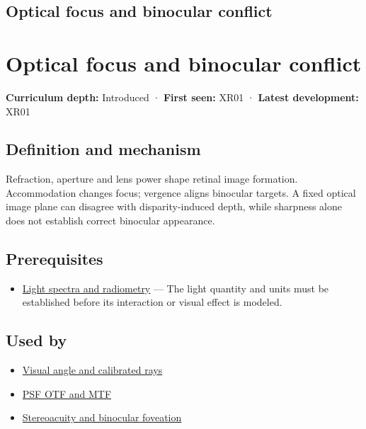 \hypertarget{appendix-f90cee1be7a4}{}
\section*{Optical focus and binocular conflict}
\chapter{Optical focus and binocular conflict}\label{appendix-f90cee1be7a4-optical-focus-and-binocular-conflict}

\textbf{Curriculum depth:} Introduced · \textbf{First seen:} XR01 · \textbf{Latest development:} XR01

\section{Definition and mechanism}\label{appendix-f90cee1be7a4-definition-and-mechanism}

Refraction, aperture and lens power shape retinal image formation. Accommodation changes focus; vergence aligns binocular targets. A fixed optical image plane can disagree with disparity-induced depth, while sharpness alone does not establish correct binocular appearance.

\section{Prerequisites}\label{appendix-f90cee1be7a4-prerequisites}

\begin{itemize}
\tightlist
\item
  \hyperref[appendix-215c2570199b]{Light spectra and radiometry} --- The light quantity and units must be established before its interaction or visual effect is modeled.
\end{itemize}

\section{Used by}\label{appendix-f90cee1be7a4-used-by}

\begin{itemize}
\tightlist
\item
  \hyperref[appendix-7d356c396d1a]{Visual angle and calibrated rays}
\item
  \hyperref[appendix-8b76b0efd27f]{PSF OTF and MTF}
\item
  \hyperref[appendix-8dc848f14052]{Stereoacuity and binocular foveation}
\end{itemize}

